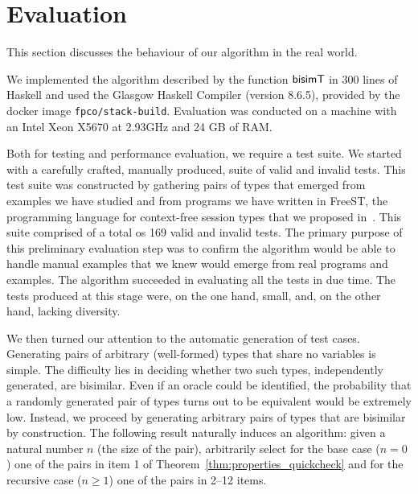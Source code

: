 \section{Evaluation}
\label{sec:evaluation}

This section discusses the behaviour of our algorithm in the real
world.

We implemented the algorithm described by the function $\mathsf{bisimT}$
in 300 lines of Haskell and used the Glasgow
Haskell Compiler (version 8.6.5), provided by the docker image 
\texttt{fpco/stack-build}. Evaluation was conducted on a machine with an Intel Xeon X5670 at 2.93GHz and 
24 GB of RAM.

Both for testing and performance evaluation, we require a test
suite. We started with a carefully crafted, manually produced, suite of
valid and invalid tests. This test suite was constructed by gathering
pairs of types that emerged from examples we have
studied and from programs we have written in FreeST, the programming language
for context-free session types that we
proposed in~\cite{almeida.etal_freest-functional-language}.
This suite comprised of a total os 169 valid and invalid tests.
The primary purpose of this preliminary evaluation
step was to confirm the algorithm would be able to handle
manual examples that we knew would emerge from real programs and
examples. The algorithm succeeded in evaluating all the tests in due time.
The tests produced at this stage were, on the one hand,
small, and, on the other hand, lacking diversity.

We then turned our
attention to the automatic generation of test cases. Generating pairs
of arbitrary (well-formed) types that share no variables is
simple. The difficulty lies in deciding whether two such types,
independently generated, are bisimilar. Even if an oracle could be
identified, the probability that a randomly generated pair of types
turns out to be equivalent would be extremely low. Instead, we proceed by
generating arbitrary pairs of types that are bisimilar by
construction. The following result naturally induces an algorithm:
given a natural number $n$ (the size of the pair), arbitrarily select
for the base case ($n=0$) one of the pairs in item 1 of
Theorem~\ref{thm:properties_quickcheck} and for the
recursive case ($n\ge1$) one of the pairs in 2--12 items.

